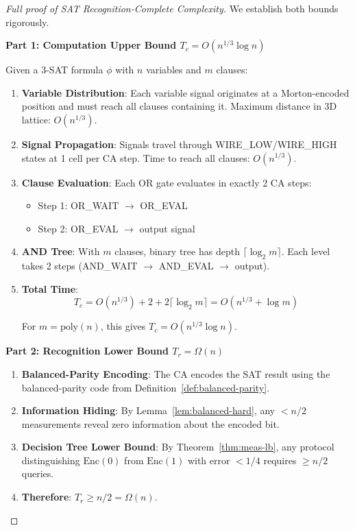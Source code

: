 \documentclass[11pt]{article}
\theoremstyle{plain}
\theoremstyle{definition}
\theoremstyle{remark}
\begin{document}
\begin{proof}[Full proof of SAT Recognition-Complete Complexity]
We establish both bounds rigorously.

\textbf{Part 1: Computation Upper Bound $T_c = O(n^{1/3} \log n)$}

Given a 3-SAT formula $\phi$ with $n$ variables and $m$ clauses:

\begin{enumerate}
\item \textbf{Variable Distribution}: Each variable signal originates at a Morton-encoded position and must reach all clauses containing it. Maximum distance in 3D lattice: $O(n^{1/3})$.

\item \textbf{Signal Propagation}: Signals travel through WIRE\_LOW/WIRE\_HIGH states at 1 cell per CA step. Time to reach all clauses: $O(n^{1/3})$.

\item \textbf{Clause Evaluation}: Each OR gate evaluates in exactly 2 CA steps:
   \begin{itemize}
   \item Step 1: OR\_WAIT $\rightarrow$ OR\_EVAL
   \item Step 2: OR\_EVAL $\rightarrow$ output signal
   \end{itemize}

\item \textbf{AND Tree}: With $m$ clauses, binary tree has depth $\lceil \log_2 m \rceil$. Each level takes 2 steps (AND\_WAIT $\rightarrow$ AND\_EVAL $\rightarrow$ output).

\item \textbf{Total Time}: 
   \[T_c = O(n^{1/3}) + 2 + 2\lceil \log_2 m \rceil = O(n^{1/3} + \log m)\]
   
   For $m = \text{poly}(n)$, this gives $T_c = O(n^{1/3} \log n)$.
\end{enumerate}

\textbf{Part 2: Recognition Lower Bound $T_r = \Omega(n)$}

\begin{enumerate}
\item \textbf{Balanced-Parity Encoding}: The CA encodes the SAT result using the balanced-parity code from Definition~\ref{def:balanced-parity}.

\item \textbf{Information Hiding}: By Lemma~\ref{lem:balanced-hard}, any $< n/2$ measurements reveal zero information about the encoded bit.

\item \textbf{Decision Tree Lower Bound}: By Theorem~\ref{thm:meas-lb}, any protocol distinguishing $\text{Enc}(0)$ from $\text{Enc}(1)$ with error $< 1/4$ requires $\geq n/2$ queries.

\item \textbf{Therefore}: $T_r \geq n/2 = \Omega(n)$.
\end{enumerate}
\end{proof}
\end{document}
